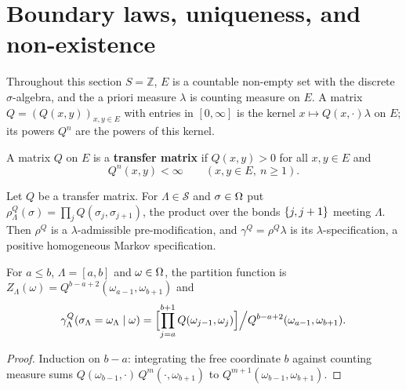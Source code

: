 \section{Boundary laws, uniqueness, and non-existence}

Throughout this section $S = \mathbb{Z}$, $E$ is a countable non-empty set with the discrete
$\sigma$-algebra, and the a priori measure $\lambda$ is counting measure on $E$. A matrix
$Q = (Q(x,y))_{x,y \in E}$ with entries in $[0,\infty]$ is the kernel $x \mapsto Q(x,\cdot)\lambda$
on $E$; its powers $Q^n$ are the powers of this kernel.

\begin{definition}
    \label{def:bl-transfer-matrix}
    \leanok

    A matrix $Q$ on $E$ is a \textbf{transfer matrix} if $Q(x,y) > 0$ for all $x, y \in E$ and
    \[
        Q^n(x,y) < \infty \qquad (x, y \in E,\ n \geq 1). \tag{11.1}
    \]
\end{definition}

\begin{definition}
    \label{def:bl-transfer-spec}
    \leanok

    Let $Q$ be a transfer matrix. For $\Lambda \in \mathcal S$ and $\sigma \in \Omega$ put
    $\rho^Q_\Lambda(\sigma) = \prod_{j} Q(\sigma_j, \sigma_{j+1})$, the product over the bonds
    $\left\{ j, j+1 \right\}$ meeting $\Lambda$. Then $\rho^Q$ is a $\lambda$-admissible pre-modification, and
    $\gamma^Q = \rho^Q \lambda$ is its $\lambda$-specification, a positive homogeneous Markov
    specification.
\end{definition}

\begin{proposition}[Georgii (11.2)]
    \label{prop:bl-11-2}
    \leanok

    For $a \leq b$, $\Lambda = [a,b]$ and $\omega \in \Omega$, the partition function is
    $Z_\Lambda(\omega) = Q^{b-a+2}(\omega_{a-1}, \omega_{b+1})$ and
    \[
        \gamma^Q_\Lambda(\sigma_\Lambda = \omega_\Lambda \mid \omega)
        = \Bigl[\prod_{j=a}^{b+1} Q(\omega_{j-1}, \omega_j)\Bigr] \Big/ Q^{b-a+2}(\omega_{a-1}, \omega_{b+1}).
    \]
\end{proposition}
\begin{proof}
    \leanok
    Induction on $b - a$: integrating the free coordinate $b$ against counting measure sums
    $Q(\omega_{b-1}, \cdot)\,Q^{m}(\cdot, \omega_{b+1})$ to $Q^{m+1}(\omega_{b-1}, \omega_{b+1})$.
\end{proof}

